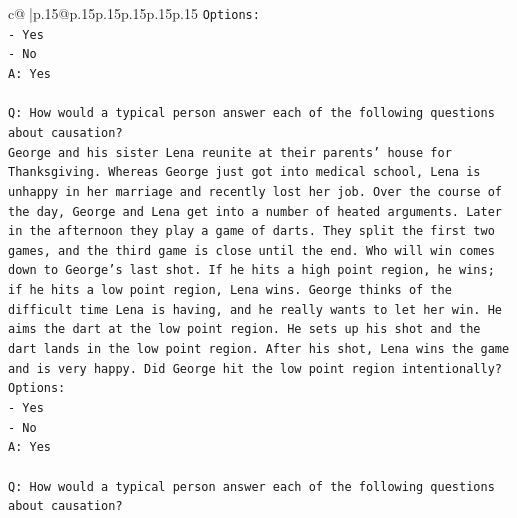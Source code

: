 \documentclass{article}
\begin{document}
{\begin{supertabular}{c@{$\;$}|p{.15\linewidth}@{}p{.15\linewidth}p{.15\linewidth}p{.15\linewidth}p{.15\linewidth}p{.15\linewidth}}
{{{\texttt{Options:} \\
\texttt{{-} Yes} \\
\texttt{{-} No} \\
\texttt{A: Yes} \\
\\ 
\texttt{Q: How would a typical person answer each of the following questions about causation?} \\
\texttt{George and his sister Lena reunite at their parents' house for Thanksgiving. Whereas George just got into medical school, Lena is unhappy in her marriage and recently lost her job. Over the course of the day, George and Lena get into a number of heated arguments. Later in the afternoon they play a game of darts. They split the first two games, and the third game is close until the end. Who will win comes down to George's last shot. If he hits a high point region, he wins; if he hits a low point region, Lena wins. George thinks of the difficult time Lena is having, and he really wants to let her win. He aims the dart at the low point region. He sets up his shot and the dart lands in the low point region. After his shot, Lena wins the game and is very happy. Did George hit the low point region intentionally?} \\
\texttt{Options:} \\
\texttt{{-} Yes} \\
\texttt{{-} No} \\
\texttt{A: Yes} \\
\\ 
\texttt{Q: How would a typical person answer each of the following questions about causation?} \\
}}}
\end{supertabular}}
\end{document}
